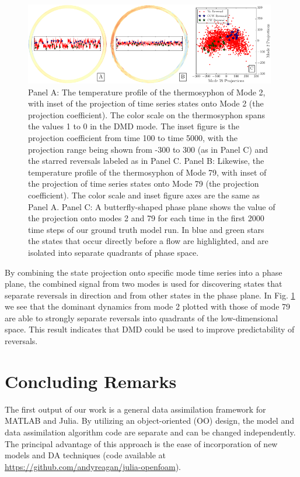 \documentclass[pre,twocolumn,twoside,byrevtex,superscriptaddress]{revtex4}
\begin{document}
\begin{figure}[h]
  \centering
  \includegraphics[width=0.98\textwidth]{fig11_combined-phase-potrait-2-79-python.pdf}
  \caption[]{
    Panel A: The temperature profile of the thermosyphon of Mode 2, with inset of the projection of time series states onto Mode 2 (the projection coefficient).
    The color scale on the thermosyphon spans the values 1 to 0 in the DMD mode.
    The inset figure is the projection coefficient from time 100 to time 5000, with the projection range being shown from -300 to 300 (as in Panel C) and the starred reversals labeled as in Panel C.
    Panel B: Likewise, the temperature profile of the thermosyphon of Mode 79, with inset of the projection of time series states onto Mode 79 (the projection coefficient).
    The color scale and inset figure axes are the same as Panel A.
    Panel C: A butterfly-shaped phase plane shows the value of the projection onto modes 2 and 79 for each time in the first 2000 time steps of our ground truth model run.
    In blue and green stars the states that occur directly before a flow are highlighted, and are isolated into separate quadrants of phase space.
  }
  \label{fig:DMD_phaseplane}
\end{figure}

By combining the state projection onto specific mode time series into a phase plane, the combined signal from two modes is used for discovering states that separate reversals in direction and from other states in the phase plane.
In Fig. \ref{fig:DMD_phaseplane} we see that the dominant dynamics from mode 2 plotted with those of mode 79 are able to strongly separate reversals into quadrants of the low-dimensional space.
This result indicates that DMD could be used to improve predictability of reversals.

\section*{Concluding Remarks}

The first output of our work is a general data assimilation framework for MATLAB and Julia.
By utilizing an object-oriented (OO) design, the model and data assimilation algorithm code are separate and can be changed independently.
The principal advantage of this approach is the ease of incorporation of new models and DA techniques (code available at \url{https://github.com/andyreagan/julia-openfoam}).
\end{document}
